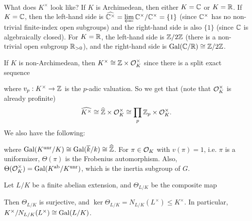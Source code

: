 \begin{remark}
  What does $\widehat{K^\times}$ look like?
  If $K$ is Archimedean, then either $K = \mathbb{C}$
  or $K = \mathbb{R}$. If $K = \mathbb{C}$, then
  the left-hand side is $\widehat{\mathbb{C}^\times} = \varprojlim \mathbb{C}^\times / \mathbb{C}^\times = \{1\}$
  (since $\mathbb{C}^\times$ has no non-trivial
  finite-index open subgroups)
  and the right-hand side is also $\{1\}$
  (since $\mathbb{C}$ is algebraically closed).
  For $K = \mathbb{R}$, the left-hand side is
  $\mathbb{Z} / 2\mathbb{Z}$ (there is a non-trivial
  open subgroup $\mathbb{R}_{> 0}$), and the
  right-hand side is $\operatorname{Gal}(\mathbb{C} / \mathbb{R}) \cong \mathbb{Z} / 2\mathbb{Z}$.

  If $K$ is non-Archimedean, then
  $K^\times \cong \mathbb{Z} \times \mathcal{O}_K^\times$ since
  there is a split exact sequence
  \begin{center}
  \end{center}
  where $v_p : K^\times \to \mathbb{Z}$ is the
  $p$-adic valuation. So we get that
  (note that $\mathcal{O}_K^\times$ is already profinite)
  \[
    \widehat{K^\times} \cong \widehat{\mathbb{Z}} \times \mathcal{O}_K^\times
    \cong \prod_{p} \mathbb{Z}_p \times \mathcal{O}_K^\times.
  \]
  We also have the following:
  \begin{center}
  \end{center}
  where $\operatorname{Gal}(K^\mathrm{unr} / K) \cong \operatorname{Gal}(\overline{k} / k) \cong \widehat{\mathbb{Z}}$.
  For $\pi \in \mathcal{O}_K$ with
  $v(\pi) = 1$, i.e. $\pi$ is a uniformizer,
  $\Theta(\pi)$ is
  the Frobenius automorphism.
  Also,
  $\Theta(\mathcal{O}_K^\times) = \operatorname{Gal}(K^\mathrm{ab} / K^\mathrm{unr})$,
  which is the inertia subgroup of $G$.
\end{remark}

\begin{theorem}
  Let $L / K$ be a finite abelian extension, and
  $\Theta_{L / K}$ be the composite map
  \begin{center}
  \end{center}
  Then $\Theta_{L / K}$ is surjective, and
  $\ker \Theta_{L / K} = N_{L / K}(L^\times) \le K^\times$.
  In particular, $K^\times / N_{L / K}(L^\times) \cong \operatorname{Gal}(L / K)$.
\end{theorem}

